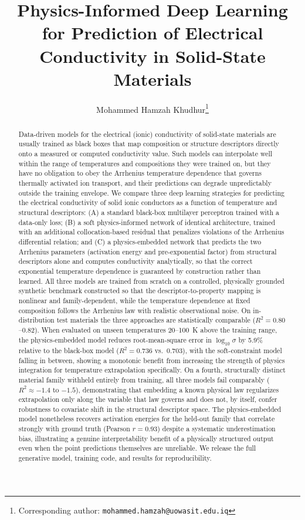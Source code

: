 \documentclass[11pt]{article}
\title{Physics-Informed Deep Learning for Prediction of Electrical Conductivity in Solid-State Materials}
\author[1]{Mohammed Hamzah Khudhur\thanks{Corresponding author: \texttt{mohammed.hamzah@uowasit.edu.iq}}}
\affil[1]{Department of Electrical Engineering, College of Engineering, University of Wasit, Kut, Iraq}
\date{}
\begin{document}
\maketitle

\begin{abstract}
Data-driven models for the electrical (ionic) conductivity of solid-state materials are usually trained as black boxes that map composition or structure descriptors directly onto a measured or computed conductivity value. Such models can interpolate well within the range of temperatures and compositions they were trained on, but they have no obligation to obey the Arrhenius temperature dependence that governs thermally activated ion transport, and their predictions can degrade unpredictably outside the training envelope. We compare three deep learning strategies for predicting the electrical conductivity of solid ionic conductors as a function of temperature and structural descriptors: (A) a standard black-box multilayer perceptron trained with a data-only loss; (B) a soft physics-informed network of identical architecture, trained with an additional collocation-based residual that penalizes violations of the Arrhenius differential relation; and (C) a physics-embedded network that predicts the two Arrhenius parameters (activation energy and pre-exponential factor) from structural descriptors alone and computes conductivity analytically, so that the correct exponential temperature dependence is guaranteed by construction rather than learned. All three models are trained from scratch on a controlled, physically grounded synthetic benchmark constructed so that the descriptor-to-property mapping is nonlinear and family-dependent, while the temperature dependence at fixed composition follows the Arrhenius law with realistic observational noise. On in-distribution test materials the three approaches are statistically comparable ($R^2 = 0.80$–$0.82$). When evaluated on unseen temperatures 20–100~K above the training range, the physics-embedded model reduces root-mean-square error in $\log_{10}\sigma$ by 5.9\% relative to the black-box model ($R^2 = 0.736$ vs.\ $0.703$), with the soft-constraint model falling in between, showing a monotonic benefit from increasing the strength of physics integration for temperature extrapolation specifically. On a fourth, structurally distinct material family withheld entirely from training, all three models fail comparably ($R^2 \approx -1.4$ to $-1.5$), demonstrating that embedding a known physical law regularizes extrapolation only along the variable that law governs and does not, by itself, confer robustness to covariate shift in the structural descriptor space. The physics-embedded model nonetheless recovers activation energies for the held-out family that correlate strongly with ground truth (Pearson $r = 0.93$) despite a systematic underestimation bias, illustrating a genuine interpretability benefit of a physically structured output even when the point predictions themselves are unreliable. We release the full generative model, training code, and results for reproducibility.
\end{abstract}
\end{document}
